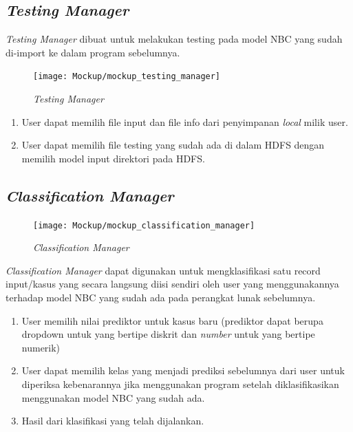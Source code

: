 \subsection{\textit{Testing Manager}}
\label{subsec:Testing Manager}

\textit{Testing Manager} dibuat untuk melakukan testing pada model NBC yang sudah di-import ke dalam program sebelumnya.

\begin{figure}[H]
	\centering
	\texttt{[image: Mockup/mockup\_testing\_manager]}
	\caption[\textit{Testing Manager}]{\textit{Testing Manager}}
	\label{fig:Testing Manager}
\end{figure}
\begin{enumerate}
	\item User dapat memilih file input dan file info dari penyimpanan \textit{local} milik user.
	\item User dapat memilih file testing yang sudah ada di dalam HDFS dengan memilih model input direktori pada HDFS.
\end{enumerate}

\subsection{\textit{Classification Manager}}
\label{subsec:Classification Manager}

\begin{figure}[H]
	\centering
	\texttt{[image: Mockup/mockup\_classification\_manager]}
	\caption[\textit{Classification Manager}]{\textit{Classification Manager}}
	\label{fig:Classification Manager}
\end{figure}
\textit{Classification Manager} dapat digunakan untuk mengklasifikasi satu record input/kasus yang secara langsung diisi sendiri oleh user yang menggunakannya terhadap model NBC yang sudah ada pada perangkat lunak sebelumnya.
\begin{enumerate}
	\item User memilih nilai prediktor untuk kasus baru (prediktor dapat berupa dropdown untuk yang bertipe diskrit dan \textit{number} untuk yang bertipe numerik)
	\item User dapat memilih kelas yang menjadi prediksi sebelumnya dari user untuk diperiksa kebenarannya jika menggunakan program setelah diklasifikasikan menggunakan model NBC yang sudah ada.
	\item Hasil dari klasifikasi yang telah dijalankan.
\end{enumerate}

